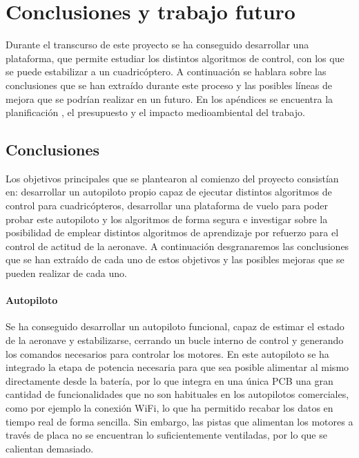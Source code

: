 \chapter{Conclusiones y trabajo futuro}

Durante el transcurso de este proyecto se ha conseguido desarrollar una plataforma, que permite estudiar los distintos algoritmos de control, con los que se puede estabilizar a un cuadricóptero. A continuación se hablara sobre las conclusiones que se han extraído durante este proceso y las posibles líneas de mejora que se podrían realizar en un futuro. En los apéndices se encuentra la planificación , el presupuesto y el impacto medioambiental del trabajo. 

\section{Conclusiones}

Los objetivos principales que se plantearon al comienzo del proyecto consistían en: desarrollar un autopiloto propio capaz de ejecutar distintos algoritmos de control para cuadricópteros, desarrollar una plataforma de vuelo para poder probar este autopiloto y los algoritmos de forma segura e investigar sobre la posibilidad de emplear distintos algoritmos de aprendizaje por refuerzo para el control de actitud de la aeronave. A continuación desgranaremos las conclusiones que se han extraído de cada uno de estos objetivos y las posibles mejoras que se pueden realizar de cada uno.

\subsubsection{Autopiloto}
Se ha conseguido desarrollar un autopiloto funcional, capaz de estimar el estado de la aeronave y estabilizarse, cerrando un bucle interno de control y generando los comandos necesarios para controlar los motores. En este autopiloto se ha integrado la etapa de potencia necesaria para que sea posible alimentar al mismo directamente desde la batería, por lo que integra en una única PCB una gran cantidad de funcionalidades que no son habituales en los autopilotos comerciales, como por ejemplo la conexión WiFi, lo que ha permitido recabar los datos en tiempo real de forma sencilla. Sin embargo, las pistas que alimentan los motores a través de placa no se encuentran lo suficientemente ventiladas, por lo que se calientan demasiado.

